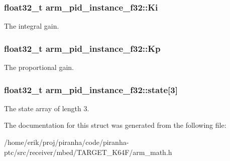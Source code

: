\subsubsection[{\texorpdfstring{Ki}{Ki}}]{\setlength{\rightskip}{0pt plus 5cm}float32\+\_\+t arm\+\_\+pid\+\_\+instance\+\_\+f32\+::\+Ki}\hypertarget{structarm__pid__instance__f32_ac0feffde05fe391eeab3bf78e953830a}{}\label{structarm__pid__instance__f32_ac0feffde05fe391eeab3bf78e953830a}
The integral gain. 
\subsubsection[{\texorpdfstring{Kp}{Kp}}]{\setlength{\rightskip}{0pt plus 5cm}float32\+\_\+t arm\+\_\+pid\+\_\+instance\+\_\+f32\+::\+Kp}\hypertarget{structarm__pid__instance__f32_aa9b9aa9e413c6cec376a9dddc9f01ebe}{}\label{structarm__pid__instance__f32_aa9b9aa9e413c6cec376a9dddc9f01ebe}
The proportional gain. 
\subsubsection[{\texorpdfstring{state}{state}}]{\setlength{\rightskip}{0pt plus 5cm}float32\+\_\+t arm\+\_\+pid\+\_\+instance\+\_\+f32\+::state\mbox{[}3\mbox{]}}\hypertarget{structarm__pid__instance__f32_afd394e1e52fb1d526aa472c83b8f2464}{}\label{structarm__pid__instance__f32_afd394e1e52fb1d526aa472c83b8f2464}
The state array of length 3. 

The documentation for this struct was generated from the following file\+:\begin{DoxyCompactItemize}
\item 
/home/erik/proj/piranha/code/piranha-\/ptc/src/receiver/mbed/\+T\+A\+R\+G\+E\+T\+\_\+\+K64\+F/arm\+\_\+math.\+h\end{DoxyCompactItemize}
